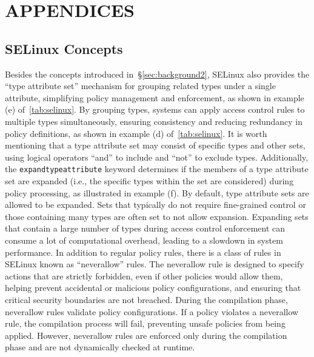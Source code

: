 \appendix
\label{sec:appendix}
\section*{\centering \MakeUppercase{Appendices}}

\subsection*{SELinux Concepts}
Besides the concepts introduced in~\S\ref{sec:background2}, SELinux also provides the ``type attribute set'' mechanism for grouping related types under a single attribute, simplifying policy management and enforcement, as shown in example (e) of~\autoref{tab:selinux}.
By grouping types, systems can apply access control rules to multiple types simultaneously, ensuring consistency and reducing redundancy in policy definitions, as shown in example (d) of~\autoref{tab:selinux}.
It is worth mentioning that a type attribute set may consist of specific types and other sets, using logical operators ``and'' to include and ``not'' to exclude types. 
Additionally, the \texttt{expandtypeattribute} keyword determines if the members of a type attribute set are expanded (i.e., the specific types within the set are considered) during policy processing, as illustrated in example (f).
By default, type attribute sets are allowed to be expanded. 
Sets that typically do not require fine-grained control or those containing many types are often set to not allow expansion. 
Expanding sets that contain a large number of types during access control enforcement can consume a lot of computational overhead, leading to a slowdown in system performance.
In addition to regular policy rules, there is a class of rules in SELinux known as ``neverallow'' rules.
The neverallow rule is designed to specify actions that are strictly forbidden, even if other policies would allow them, helping prevent accidental or malicious policy configurations, and ensuring that critical security boundaries are not breached.
During the compilation phase, neverallow rules validate policy configurations. 
If a policy violates a neverallow rule, the compilation process will fail, preventing unsafe policies from being applied.
However, neverallow rules are enforced only during the compilation phase and are not dynamically checked at runtime.


